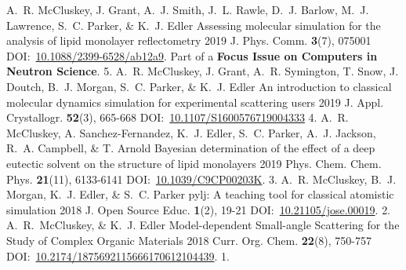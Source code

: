 \begin{cvpubys}
  \cvpuby
    {A.~R. McCluskey, J. Grant, A.~J. Smith, J.~L. Rawle, D.~J. Barlow, M.~J. Lawrence, S.~C. Parker, \& K.~J. Edler}
    {Assessing molecular simulation for the analysis of lipid monolayer reflectometry}
    {2019}
    {J. Phys. Comm.}
    {\textbf{3}(7), 075001}
    {DOI:~\href{https://doi.org/10.1088/2399-6528/ab12a9}{10.1088/2399-6528/ab12a9}. Part of a \textbf{Focus Issue on Computers in Neutron Science}.}
    {5.}
  \cvpuby
    {A.~R. McCluskey, J. Grant, A.~R. Symington, T. Snow, J. Doutch, B.~J. Morgan, S.~C. Parker, \& K.~J. Edler}
    {An introduction to classical molecular dynamics simulation for experimental scattering users}
    {2019}
    {J. Appl. Crystallogr.}
    {\textbf{52}(3), 665-668}
    {DOI:~\href{https://doi.org/10.1107/S1600576719004333}{10.1107/S1600576719004333}}
    {4.}
  \cvpuby
    {A.~R. McCluskey, A. Sanchez-Fernandez, K.~J. Edler, S.~C. Parker, A.~J. Jackson, R.~A. Campbell, \& T. Arnold}
    {Bayesian determination of the effect of a deep eutectic solvent on the structure of lipid monolayers}
    {2019}
    {Phys. Chem. Chem. Phys.}
    {\textbf{21}(11), 6133-6141}
    {DOI:~\href{https://doi.org/10.1039/C9CP00203K}{10.1039/C9CP00203K}.}
    {3.}
  \cvpuby
    {A.~R. McCluskey, B.~J. Morgan, K.~J. Edler, \& S.~C. Parker}
    {pylj: A teaching tool for classical atomistic simulation}
    {2018}
    {J. Open Source Educ.}
    {\textbf{1}(2), 19-21}
    {DOI:~\href{http://doi.org/10.21105/jose.00019}{10.21105/jose.00019}.}
    {2.}
  \cvpuby
    {A.~R.~McCluskey, \& K.~J. Edler}
    {Model-dependent Small-angle Scattering for the Study of Complex Organic Materials}
    {2018}
    {Curr. Org. Chem.}
    {\textbf{22}(8), 750-757}
    {DOI:~\href{http://doi.org/10.2174/1875692115666170612104439}{10.2174/1875692115666170612104439}.}
    {1.}
\end{cvpubys}
